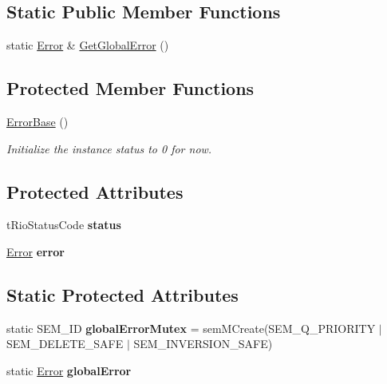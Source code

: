 \subsection*{\-Static \-Public \-Member \-Functions}
\begin{DoxyCompactItemize}
\item 
static \hyperlink{classError}{\-Error} \& \hyperlink{classErrorBase_ab85de5de437f0293356753b2ebab874c}{\-Get\-Global\-Error} ()
\end{DoxyCompactItemize}
\subsection*{\-Protected \-Member \-Functions}
\begin{DoxyCompactItemize}
\item 
\hypertarget{classErrorBase_af49991441156c7832d7017951427cef2}{\hyperlink{classErrorBase_af49991441156c7832d7017951427cef2}{\-Error\-Base} ()}\label{classErrorBase_af49991441156c7832d7017951427cef2}

\begin{DoxyCompactList}\small\item\em \-Initialize the instance status to 0 for now. \end{DoxyCompactList}\end{DoxyCompactItemize}
\subsection*{\-Protected \-Attributes}
\begin{DoxyCompactItemize}
\item 
\hypertarget{classErrorBase_a94cef1c4df1d6def498a2b3c458408c4}{t\-Rio\-Status\-Code {\bfseries status}}\label{classErrorBase_a94cef1c4df1d6def498a2b3c458408c4}

\item 
\hypertarget{classErrorBase_a74124eca104892570b174fee2c484a4f}{\hyperlink{classError}{\-Error} {\bfseries error}}\label{classErrorBase_a74124eca104892570b174fee2c484a4f}

\end{DoxyCompactItemize}
\subsection*{\-Static \-Protected \-Attributes}
\begin{DoxyCompactItemize}
\item 
\hypertarget{classErrorBase_a9138d500675bcc2310b13603e3a1099e}{static \-S\-E\-M\-\_\-\-I\-D {\bfseries global\-Error\-Mutex} = sem\-M\-Create(\-S\-E\-M\-\_\-\-Q\-\_\-\-P\-R\-I\-O\-R\-I\-T\-Y $|$ \-S\-E\-M\-\_\-\-D\-E\-L\-E\-T\-E\-\_\-\-S\-A\-F\-E $|$ \-S\-E\-M\-\_\-\-I\-N\-V\-E\-R\-S\-I\-O\-N\-\_\-\-S\-A\-F\-E)}\label{classErrorBase_a9138d500675bcc2310b13603e3a1099e}

\item 
\hypertarget{classErrorBase_aede1348bb4523e9ee6e8cadde662889b}{static \hyperlink{classError}{\-Error} {\bfseries global\-Error}}\label{classErrorBase_aede1348bb4523e9ee6e8cadde662889b}

\end{DoxyCompactItemize}


